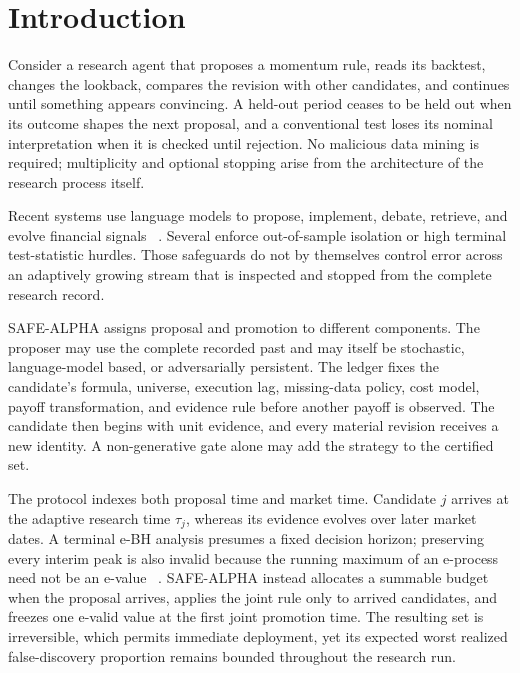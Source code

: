 \maketitle

\section{Introduction}
\label{sec:introduction}

Consider a research agent that proposes a momentum rule, reads its backtest,
changes the lookback, compares the revision with other candidates, and
continues until something appears convincing.  A held-out period ceases to be
held out when its outcome shapes the next proposal, and a conventional test
loses its nominal interpretation when it is checked until rejection.  No
malicious data mining is required; multiplicity and optional stopping arise
from the architecture of the research process itself.

Recent systems use language models to propose, implement, debate, retrieve,
and evolve financial signals
~\cite{tang2025alphaagent,duan2025factormad,shi2026hubble,han2026quantaalpha,
huang2026beyond}.  Several enforce out-of-sample isolation or high terminal
test-statistic hurdles.  Those safeguards do not by themselves control error
across an adaptively growing stream that is inspected and stopped from the
complete research record.

SAFE-ALPHA assigns proposal and promotion to different components.  The
proposer may use the complete recorded past and may itself be stochastic,
language-model based, or adversarially persistent.  The ledger fixes the
candidate's formula, universe, execution lag, missing-data policy, cost model,
payoff transformation, and evidence rule before another payoff is observed.
The candidate then begins with unit evidence, and every material revision
receives a new identity.  A non-generative gate alone may add the strategy to
the certified set.

The protocol indexes both proposal time and market time.
Candidate \(j\) arrives at the adaptive research time \(\tau_j\), whereas its
evidence evolves over later market dates.  A terminal e-BH analysis presumes a
fixed decision horizon; preserving every interim peak is also invalid because
the running maximum of an e-process need not be an e-value
~\cite{tavyrikov2025carefree}.  SAFE-ALPHA instead allocates a summable budget
when the proposal arrives, applies the joint rule only to arrived candidates,
and freezes one e-valid value at the first joint promotion time.  The resulting
set is irreversible, which permits immediate deployment, yet its expected
worst realized false-discovery proportion remains bounded throughout the
research run.

